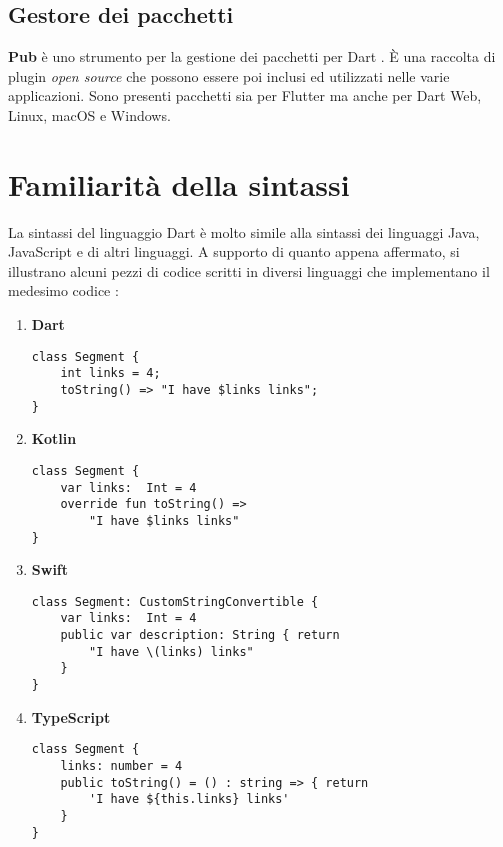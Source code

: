 \subsection{Gestore dei pacchetti}
\textbf{Pub} è uno strumento per la gestione dei pacchetti per Dart \cite{pub}. È una raccolta di plugin \textit{open source} che possono essere poi inclusi ed utilizzati nelle varie applicazioni. Sono presenti pacchetti sia per Flutter ma anche per Dart Web, Linux, macOS e Windows.

\section{Familiarità della sintassi}
La sintassi del linguaggio Dart è molto simile alla sintassi dei linguaggi Java, JavaScript e di altri linguaggi. A supporto di quanto appena affermato, si illustrano alcuni pezzi di codice scritti in diversi linguaggi che implementano il medesimo codice \cite{confronto_linguaggi}:
\begin{enumerate}
\item \textbf{Dart}


\begin{lstlisting}
class Segment {
	int links = 4;
	toString() => "I have $links links";
}
\end{lstlisting}

\item \textbf{Kotlin}
\begin{lstlisting}
class Segment {
	var links:  Int = 4
	override fun toString() => 
		"I have $links links"
}
\end{lstlisting}

\newpage

\item \textbf{Swift}
\begin{lstlisting}
class Segment: CustomStringConvertible {
	var links:  Int = 4
	public var description: String { return
		"I have \(links) links"
	}
}
\end{lstlisting}

\item \textbf{TypeScript}
\begin{lstlisting}
class Segment {
	links: number = 4
	public toString() = () : string => { return
		'I have ${this.links} links'
	}
}
\end{lstlisting}
\end{enumerate}

